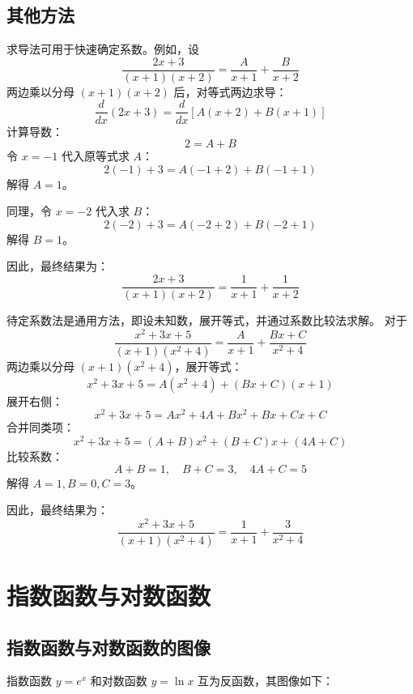 \documentclass[8pt,a4paper,twoside]{tau-class/tau}
\begin{document}
\subsection{其他方法}

\begin{tcolorbox}[enhanced, breakable, boxsep=1pt, colframe=blue!50!black, colback=white, fonttitle=\footnotesize, fontupper=\footnotesize, title=求导法]
求导法可用于快速确定系数。例如，设
\[
    \frac{2x+3}{(x+1)(x+2)} = \frac{A}{x+1} + \frac{B}{x+2}
\]
两边乘以分母 $(x+1)(x+2)$ 后，对等式两边求导：
\[
    \frac{d}{dx} (2x+3) = \frac{d}{dx} \left[A(x+2) + B(x+1)\right]
\]
计算导数：
\[
    2 = A + B
\]
令 $x= − 1$ 代入原等式求 $A$：
\[
    2( − 1) + 3 = A( − 1+2) + B( − 1+1)
\]
解得 $A = 1$。

同理，令 $x= − 2$ 代入求 $B$：
\[
    2( − 2) + 3 = A( − 2+2) + B( − 2+1)
\]
解得 $B = 1$。

因此，最终结果为：
\[
    \frac{2x+3}{(x+1)(x+2)} = \frac{1}{x+1} + \frac{1}{x+2}
\]
\end{tcolorbox}

\begin{tcolorbox}[enhanced, breakable, boxsep=1pt, colframe=blue!50!black, colback=white, fonttitle=\footnotesize, fontupper=\footnotesize, title=待定系数法]
待定系数法是通用方法，即设未知数，展开等式，并通过系数比较法求解。
对于
\[
    \frac{x^2+3x+5}{(x+1)(x^2+4)} = \frac{A}{x+1} + \frac{Bx+C}{x^2+4}
\]
两边乘以分母 $(x+1)(x^2+4)$，展开等式：
\[
    x^2+3x+5 = A(x^2+4) + (Bx+C)(x+1)
\]
展开右侧：
\[
    x^2+3x+5 = Ax^2 + 4A + Bx^2 + Bx + Cx + C
\]
合并同类项：
\[
    x^2 + 3x + 5 = (A+B)x^2 + (B+C)x + (4A+C)
\]
比较系数：
\[
    A+B = 1, \quad B+C = 3, \quad 4A+C = 5
\]
解得 $A=1, B=0, C=3$。

因此，最终结果为：
\[
    \frac{x^2+3x+5}{(x+1)(x^2+4)} = \frac{1}{x+1} + \frac{3}{x^2+4}
\]
\end{tcolorbox}
\newpage
\section{指数函数与对数函数}
\subsection{指数函数与对数函数的图像}

指数函数 $y = e^x$ 和对数函数 $y = \ln x$ 互为反函数，其图像如下：
\end{document}
